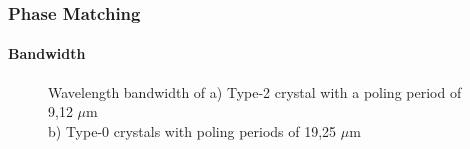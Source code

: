 \documentclass[serif,8pt]{beamer}
\begin{document}
\begin{frame}[t]
	\frametitle{Phase Matching}
	\framesubtitle{Bandwidth}
	\begin{figure}[!ht]
	  \centering
	  \caption{Wavelength bandwidth of a) Type-2 crystal with a poling period of 9,12 $\mu$m\\ b) Type-0 crystals with poling periods of 19,25 $\mu$m}
	  \quad
	  \label{fig:CompT0a2}
	\end{figure}
\end{frame}



\end{document}
